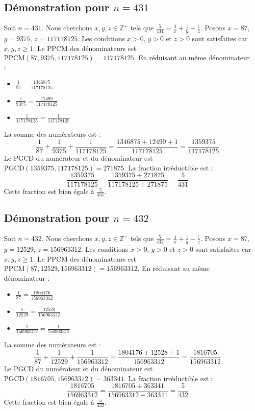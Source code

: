 \documentclass[11pt,a4paper]{article}
\begin{document}
\subsection{Démonstration pour $n = 431$}
Soit $n = 431$. Nous cherchons $x, y, z \in \mathbb{Z}^{+}$ tels que $\frac{5}{431} = \frac{1}{x} + \frac{1}{y} + \frac{1}{z}$.
Posons $x = 87$, $y = 9375$, $z = 117178125$.
Les conditions $x > 0$, $y > 0$ et $z > 0$ sont satisfaites car $x, y, z \geq 1$.
Le PPCM des dénominateurs est $\text{PPCM}(87, 9375, 117178125) = 117178125$.
En réduisant au même dénominateur :
\begin{itemize}
    \item $\frac{1}{87} = \frac{1346875}{117178125}$
    \item $\frac{1}{9375} = \frac{12499}{117178125}$
    \item $\frac{1}{117178125} = \frac{1}{117178125}$
\end{itemize}
La somme des numérateurs est :
$$ \frac{1}{87} + \frac{1}{9375} + \frac{1}{117178125} = \frac{1346875 + 12499 + 1}{117178125} = \frac{1359375}{117178125} $$
Le PGCD du numérateur et du dénominateur est $\text{PGCD}(1359375, 117178125) = 271875$.
La fraction irréductible est :
$$ \frac{1359375}{117178125} = \frac{1359375 \div 271875}{117178125 \div 271875} = \frac{5}{431} $$
Cette fraction est bien égale à $\frac{5}{431}$.

\subsection{Démonstration pour $n = 432$}
Soit $n = 432$. Nous cherchons $x, y, z \in \mathbb{Z}^{+}$ tels que $\frac{5}{432} = \frac{1}{x} + \frac{1}{y} + \frac{1}{z}$.
Posons $x = 87$, $y = 12529$, $z = 156963312$.
Les conditions $x > 0$, $y > 0$ et $z > 0$ sont satisfaites car $x, y, z \geq 1$.
Le PPCM des dénominateurs est $\text{PPCM}(87, 12529, 156963312) = 156963312$.
En réduisant au même dénominateur :
\begin{itemize}
    \item $\frac{1}{87} = \frac{1804176}{156963312}$
    \item $\frac{1}{12529} = \frac{12528}{156963312}$
    \item $\frac{1}{156963312} = \frac{1}{156963312}$
\end{itemize}
La somme des numérateurs est :
$$ \frac{1}{87} + \frac{1}{12529} + \frac{1}{156963312} = \frac{1804176 + 12528 + 1}{156963312} = \frac{1816705}{156963312} $$
Le PGCD du numérateur et du dénominateur est $\text{PGCD}(1816705, 156963312) = 363341$.
La fraction irréductible est :
$$ \frac{1816705}{156963312} = \frac{1816705 \div 363341}{156963312 \div 363341} = \frac{5}{432} $$
Cette fraction est bien égale à $\frac{5}{432}$.
\end{document}
